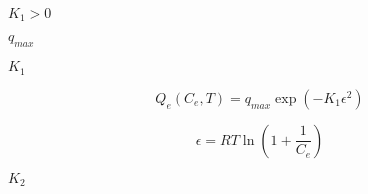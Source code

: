 \documentclass{article}
\begin{document}
$ K_1 > 0 $
\pagebreak

$ q_{max} $
\pagebreak

$ K_1 $
\pagebreak

\[
    Q_e (C_e, T) = q_{max} \exp( -K_1 \epsilon^2 )
\]
\pagebreak

\[
    \epsilon = R T \ln \left(1 + \frac{1}{C_e} \right)
\]
\pagebreak

$ K_2 $
\pagebreak
\end{document}
